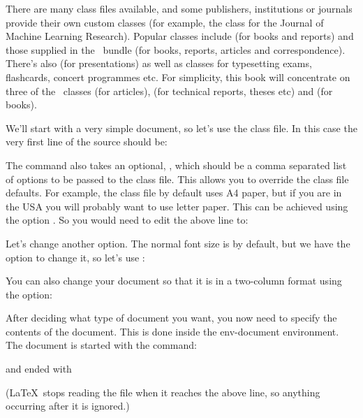 There are many class files available, and some publishers,
institutions or journals provide their own custom classes (for
example, the  class for the Journal of Machine Learning
Research). Popular classes include  (for books and
reports) and those supplied in the \koma\ bundle (for books,
reports, articles and correspondence). There's also 
(for presentations) as well as classes for typesetting exams,
flashcards, concert programmes etc. For simplicity, this
book will concentrate on three of the
\koma\ classes  (for articles), 
(for technical reports, theses etc) and  (for books).

We'll start with a very simple document, so let's use the
 class file.  In this case the very first line of the
\gls{source} should be:
\begin{codeS}
\end{codeS}
The  command also takes an 
\gls{optional}, ,
which should be a comma separated list of options to be passed to the
class file.  This allows you to override the class file defaults.
For example, the  class file by default uses A4 
paper, but if you are in the USA you will probably want to use
letter paper.  This can be achieved
using the option .  So you would need to edit the
above line to:
\begin{codeS}
\end{codeS}
\label{obj:sizeopt}%
Let's change another option.  The normal font size is \clsopt{11pt}
by default, but we have the option to change it, so let's use
\clsopt{12pt}:
\begin{codeS}
\end{codeS}
You can also change your document so that it is in a two-column
format using the  option:
\begin{codeS}
\end{codeS}

After deciding what type of document you want, you now need to specify
the contents of the document.  This is done inside the \gls{env-document}
\gls{environment}.  The document is started with the
command:
\begin{codeS}
\end{codeS}
and ended with
\begin{codeS}
\end{codeS}
(\LaTeX\ stops reading the file when it reaches the above line, so
anything occurring after it is ignored.)

